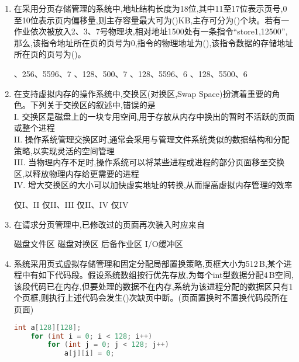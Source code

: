 \documentclass[12pt, a4paper, oneside, UTF8]{ctexbook}
\begin{document}
\begin{enumerate}
    
    \item 在采用分页存储管理的系统中,地址结构长度为18位,其中11至17位表示页号,0至10位表示页内偏移量,则主存容量最大可为()KB,主存可分为()个块。若有一作业依次被放入2、3、7号物理块,相对地址1500处有一条指令“store1,12500”,那么,该指令地址所在页的页号为0,指令的物理地址为(),该指令数据的存储地址所在页的页号为()。
    \begin{choices}[1]
    、256、5596、7
    、128、500、7
    、128、5596、6
    、128、5500、6
    \end{choices}


    \item 在支持虚拟内存的操作系统中,交换区(对换区,Swap Space)扮演着重要的角色。下列关于交换区的叙述中,错误的是\\
    I. 交换区是磁盘上的一块专用空间,用于存放从内存中换出的暂时不活跃的页面或整个进程\\
    II. 操作系统管理交换区时,通常会采用与管理文件系统类似的数据结构和分配策略,以实现灵活的空间管理\\
    III. 当物理内存不足时,操作系统可以将某些进程或进程的部分页面移至交换区,以释放物理内存给更需要的进程\\
    IV. 增大交换区的大小可以加快虚实地址的转换,从而提高虚拟内存管理的效率
    \begin{choices}[1]
    \task 仅I、II
    \task 仅II、III
    \task 仅II、IV
    \task 仅IV
    \end{choices}

    \item 在请求分页管理中,已修改过的页面再次装入时应来自
    \begin{choices}[1]
    \task 磁盘文件区
    \task 磁盘对换区
    \task 后备作业区
    \task I/O缓冲区
    \end{choices}

    \item 系统采用页式虚拟存储管理和固定分配局部置换策略,页框大小为512\,B,某个进程中有如下代码段。假设系统数组按行优先存放,为每个int型数据分配4\,B空间,该段代码已在内存,但要处理的数据不在内存,系统为该进程分配的数据区只有1个页框,则执行上述代码会发生()次缺页中断。(页面置换时不置换代码段所在页面)
    \begin{lstlisting}[language=C]
    int a[128][128];
    for (int i = 0; i < 128; i++)
        for (int j = 0; j < 128; j++)
            a[j][i] = 0;
    \end{lstlisting}
    \begin{choices}[1]
    \end{choices}


\end{enumerate}
\end{document}
